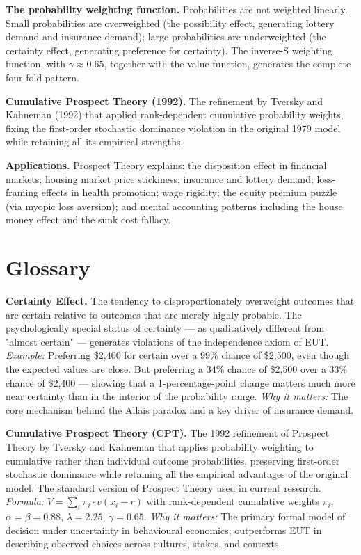\documentclass[12pt, letterpaper]{article}
\begin{document}
\textbf{The probability weighting function.} Probabilities are not weighted linearly. Small probabilities are overweighted (the possibility effect, generating lottery demand and insurance demand); large probabilities are underweighted (the certainty effect, generating preference for certainty). The inverse-S weighting function, with $\gamma \approx 0.65$, together with the value function, generates the complete four-fold pattern.

\textbf{Cumulative Prospect Theory (1992).} The refinement by Tversky and Kahneman (1992) that applied rank-dependent cumulative probability weights, fixing the first-order stochastic dominance violation in the original 1979 model while retaining all its empirical strengths.

\textbf{Applications.} Prospect Theory explains: the disposition effect in financial markets; housing market price stickiness; insurance and lottery demand; loss-framing effects in health promotion; wage rigidity; the equity premium puzzle (via myopic loss aversion); and mental accounting patterns including the house money effect and the sunk cost fallacy.

\medskip


\section*{Glossary}


\textbf{Certainty Effect.} The tendency to disproportionately overweight outcomes that are certain relative to outcomes that are merely highly probable. The psychologically special status of certainty --- as qualitatively different from "almost certain" --- generates violations of the independence axiom of EUT. \textit{Example:} Preferring \$2,400 for certain over a 99\% chance of \$2,500, even though the expected values are close. But preferring a 34\% chance of \$2,500 over a 33\% chance of \$2,400 --- showing that a 1-percentage-point change matters much more near certainty than in the interior of the probability range. \textit{Why it matters:} The core mechanism behind the Allais paradox and a key driver of insurance demand.

\textbf{Cumulative Prospect Theory (CPT).} The 1992 refinement of Prospect Theory by Tversky and Kahneman that applies probability weighting to cumulative rather than individual outcome probabilities, preserving first-order stochastic dominance while retaining all the empirical advantages of the original model. The standard version of Prospect Theory used in current research. \textit{Formula:} $V = \sum_i \pi_i \cdot v(x_i - r)$ with rank-dependent cumulative weights $\pi_i$, $\alpha = \beta = 0.88$, $\lambda = 2.25$, $\gamma = 0.65$. \textit{Why it matters:} The primary formal model of decision under uncertainty in behavioural economics; outperforms EUT in describing observed choices across cultures, stakes, and contexts.
\end{document}

